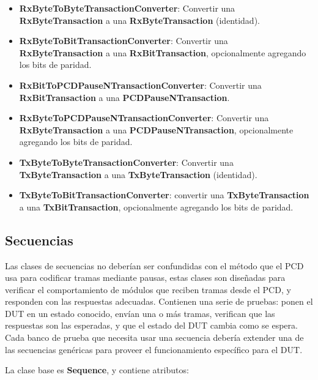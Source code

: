 \documentclass[a4paper, twoside, 11pt]{report}
\begin{document}
\begin{itemize}
  \item \textbf{RxByteToByteTransactionConverter}: Convertir una \textbf{RxByteTransaction} a una \textbf{RxByteTransaction} (identidad).
  \item \textbf{RxByteToBitTransactionConverter}: Convertir una \textbf{RxByteTransaction} a una \textbf{RxBitTransaction}, opcionalmente agregando los bits de paridad.
  \item \textbf{RxBitToPCDPauseNTransactionConverter}: Convertir una \textbf{RxBitTransaction} a una \textbf{PCDPauseNTransaction}.
  \item \textbf{RxByteToPCDPauseNTransactionConverter}: Convertir una \textbf{RxByteTransaction} a una \textbf{PCDPauseNTransaction}, opcionalmente agregando los bits de paridad.
  \item \textbf{TxByteToByteTransactionConverter}: Convertir una \textbf{TxByteTransaction} a una \textbf{TxByteTransaction} (identidad).
  \item \textbf{TxByteToBitTransactionConverter}: convertir una \textbf{TxByteTransaction} a una \textbf{TxBitTransaction}, opcionalmente agregando los bits de paridad.
\end{itemize}

\FloatBarrier
\subsection{Secuencias}

Las clases de secuencias no deberían ser confundidas con el método que el PCD usa para codificar tramas mediante pausas, estas clases son diseñadas para verificar el comportamiento de módulos que reciben tramas desde el PCD, y responden con las respuestas adecuadas. Contienen una serie de pruebas: ponen el DUT en un estado conocido, envían una o más tramas, verifican que las respuestas son las esperadas, y que el estado del DUT cambia como se espera. Cada banco de prueba que necesita usar una secuencia debería extender una de las secuencias genéricas para proveer el funcionamiento específico para el DUT.

La clase base es \textbf{Sequence}, y contiene atributos:
\end{document}
